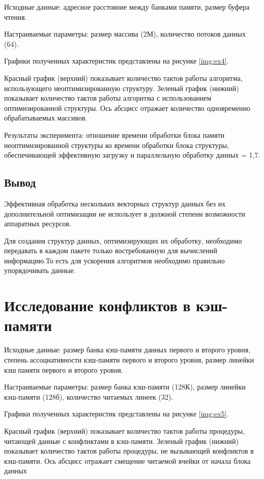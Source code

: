 Исходные данные: адресное расстояние между банками памяти, размер буфера чтения.

Настраиваемые параметры: размер массива (2М), количество потоков данных (64).

Графики полученных характеристик представлены на рисунке \ref{img:ex4}.



Красный график (верхний) показывает количество тактов работы алгоритма, использующего неоптимизированную структуру. Зеленый график (нижний) показывает  количество тактов работы алгоритма с использованием оптимизированной структуры. Ось абсцисс отражает количество одновременно обрабатываемых массивов.

Результаты эксперимента: отношение времени обработки блока памяти неоптимизированной структуры ко времени обработки блока структуры, обеспечивающей эффективную загрузку и параллельную обработку данных = 1,7.

\section*{Вывод}
Эффективная обработка нескольких векторных структур данных без их дополнительной оптимизации не использует в должной степени возможности аппаратных ресурсов. 

Для создания структур данных, оптимизирующих их обработку, необходимо передавать в каждом пакете только востребованную для вычислений информацию.То есть для ускорения алгоритмов необходимо правильно упорядочивать данные.


\chapter*{Исследование конфликтов в кэш-памяти}

Исходные данные: размер банка кэш-памяти данных первого и второго уровня, степень ассоциативности кэш-памяти первого и второго уровня, размер линейки кэшпамяти первого и второго уровня.

Настраиваемые параметры: размер банка кэш-памяти (128К), размер линейки кэш-памяти (128б), количество читаемых линеек (32).

Графики полученных характеристик представлены на рисунке \ref{img:ex5}.



Красный график (верхний) показывает  количество тактов работы процедуры, читающей данные с конфликтами в кэш-памяти. Зеленый график (нижний) показывает количество тактов работы процедуры, не вызывающей конфликтов в кэш-памяти. Ось абсцисс отражает смещение читаемой ячейки от начала блока данных

